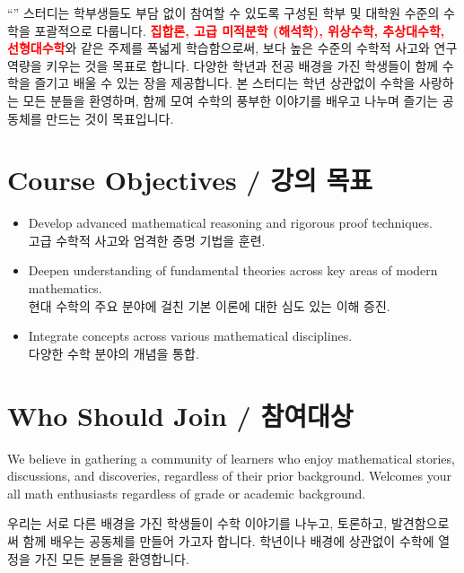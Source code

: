 	\noindent ``\emph{\CourseTitleKR}'' 스터디는 학부생들도 부담 없이 참여할 수 있도록 구성된 학부 및 대학원 수준의 수학을 포괄적으로 다룹니다. \textcolor{red}{\bfseries 집합론, 고급 미적분학 (해석학), 위상수학, 추상대수학, 선형대수학}와 같은 주제를 폭넓게 학습함으로써, 보다 높은 수준의 수학적 사고와 연구 역량을 키우는 것을 목표로 합니다. 다양한 학년과 전공 배경을 가진 학생들이 함께 수학을 즐기고 배울 수 있는 장을 제공합니다. 본 스터디는 학년 상관없이 수학을 사랑하는 모든 분들을 환영하며, 함께 모여 수학의 풍부한 이야기를 배우고 나누며 즐기는 공동체를 만드는 것이 목표입니다.
	\vspace{1em}
	
	\newpage
	\section*{Course Objectives / 강의 목표}
\begin{itemize}[leftmargin=*, label={--}]
	\item Develop advanced mathematical reasoning and rigorous proof techniques.\\
	고급 수학적 사고와 엄격한 증명 기법을 훈련.
	\item \color{blue} Deepen understanding of fundamental theories across key areas of modern mathematics.\\
	현대 수학의 주요 분야에 걸친 기본 이론에 대한 심도 있는 이해 증진.
	\item \normalfont\color{black} Integrate concepts across various mathematical disciplines.\\
	다양한 수학 분야의 개념을 통합.
\end{itemize}

\vspace{.5em}
	\section*{Who Should Join / 참여대상}
	We believe in gathering a community of learners who enjoy mathematical stories, discussions, and discoveries, regardless of their prior background. Welcomes your all math enthusiasts regardless of grade or academic background.
	\bigskip
	
	\noindent 우리는 서로 다른 배경을 가진 학생들이 수학 이야기를 나누고, 토론하고, 발견함으로써 함께 배우는 공동체를 만들어 가고자 합니다. 학년이나 배경에 상관없이 수학에 열정을 가진 모든 분들을 환영합니다. 

\newpage
	
